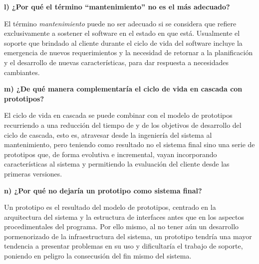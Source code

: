 \documentclass[12pt]{article}
\begin{document}
\textbf{l) ¿Por qué el término “mantenimiento” no es el más adecuado?}

El término \textit{mantenimiento} puede no ser adecuado si se considera que 
refiere exclusivamente a sostener el software en el estado en que está.
Usualmente el soporte que brindado al cliente durante el ciclo de vida del 
software incluye la emergencia de nuevos requerimientos y la necesidad de 
retornar a la planificación y el desarrollo de nuevas características,
para dar respuesta a necesidades cambiantes.

\textbf{m) ¿De qué manera complementaría el ciclo de vida en cascada con prototipos?}

El ciclo de vida en cascada se puede combinar con el modelo de prototipos 
recurriendo a una reducción del tiempo de y de los objetivos de desarrollo del 
ciclo de cascada, esto es, atravesar desde la ingeniería del sistema al 
mantenimiento, pero teniendo como resultado no el sistema final sino una serie 
de prototipos que, de forma evolutiva e incremental, vayan incorporando 
características al sistema y permitiendo la evaluación del cliente desde las 
primeras versiones.

\textbf{n) ¿Por qué no dejaría un prototipo como sistema final?}

Un prototipo es el resultado del modelo de prototipos, centrado en 
la arquitectura del sistema y la estructura de interfaces antes que en los 
aspectos procedimentales del programa. Por ello mismo, al no tener aún un 
desarrollo pormenorizado de la infraestructura del sistema, un prototipo tendría
una mayor tendencia a presentar problemas en su uso y dificultaría el trabajo 
de soporte, poniendo en peligro la consecusión del fin mismo del sistema.
\end{document}
